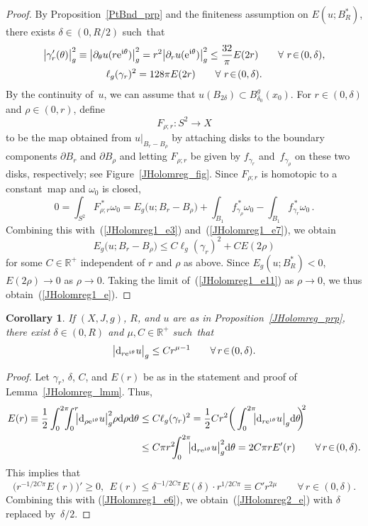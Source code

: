 \documentclass[11pt]{article}
\numberwithin{equation}{section}
\newtheorem{crl}[thm]{Corollary}
\theoremstyle{definition}
\def\BE#1{\begin{equation}\label{#1}}
\def\EE{\end{equation}}
\def\eref#1{(\ref{#1})}
\def\lra{\longrightarrow}
\def\fI{\mathfrak i}
\def\R{\mathbb R}
\def\ga{\gamma}
\def\de{\delta}
\def\om{\omega}
\def\th{\theta}
\def\prt{\partial}
\def\nd{\textnormal{d}}
\def\ne{\textnormal{e}}
\begin{document}
\begin{proof}
\noindent
By Proposition~\ref{PtBnd_prp} and the finiteness assumption on $E(u;B_R^*)$, 
there exists $\de\!\in\!(0,R/2)$ such~that
\begin{gather}
\label{JHolomreg1_e6}
\big|\ga_r'(\th)\big|_g^2\equiv 
\big|\prt_{\th}u(r\ne^{\fI\th})\big|_g^2=r^2\big|\prt_ru(\ne^{\fI\th})\big|_g^2
\le \frac{32}{\pi}E(2r) \qquad\forall~r\!\in\!(0,\de),\\
\label{JHolomreg1_e7}
\ell_g(\ga_r)^2=128\pi E(2r)
\qquad\forall~r\!\in\!(0,\de).
\end{gather}
By the continuity of~$u$, we can assume that  $u(B_{2\de})\!\subset\!B_{\de_0}^g(x_0)$.
For $r\!\in\!(0,\de)$ and $\rho\!\in\!(0,r)$, define
$$F_{\rho;r}\!:S^2\lra X$$ 
to be the map obtained from $u|_{B_r-B_{\rho}}$ by attaching disks to the boundary components 
$\prt B_r$ and $\prt B_{\rho}$ and letting $F_{\rho;r}$ be given by 
$f_{\ga_r}$ and~$f_{\ga_{\rho}}$ on these two disks, respectively;
see Figure~\ref{JHolomreg_fig}.
Since $F_{\rho;r}$ is  homotopic to a constant~map and $\om_0$ is closed,
$$0=\int_{S^2}\!F_{\rho;r}^{\,*}\om_0
=E_g\big(u;B_r\!-\!B_{\rho}\big)+\int_{B_1}\!\!\!f_{\ga_{\rho}}^{\,*}\om_0
-\int_{B_1}\!\!\!f_{\ga_r}^{\,*}\om_0\,.$$
Combining this with~\eref{JHolomreg1_e3} and~\eref{JHolomreg1_e7}, we obtain
\BE{JHolomreg1_e11}E_g\big(u;B_r\!-\!B_{\rho}\big)\le C\ell_g(\ga_r)^2+CE(2\rho)\EE
for some $C\!\in\!\R^+$ independent of $r$ and $\rho$ as above.
Since $E_g(u;B_R^*)\!<\!0$, $E(2\rho)\!\lra\!0$ as \hbox{$\rho\!\lra\!0$}.
Taking the limit of~\eref{JHolomreg1_e11} as $\rho\!\lra\!0$, 
we thus obtain~\eref{JHolomreg1_e}.
\end{proof}


\begin{crl}\label{JHolomreg_crl}
If $(X,J,g)$, $R$, and $u$ are as in Proposition~\ref{JHolomreg_prp},
there exist $\de\!\in\!(0,R)$ and $\mu,C\!\in\!\R^+$ such~that 
\BE{JHolomreg2_e}
\big|\nd_{r\ne^{\fI\th}}u\big|_g\le Cr^{\mu-1} 
\qquad\forall\,r\!\in\!(0,\de).\EE
\end{crl}

\begin{proof}
Let $\ga_r$, $\de$, $C$, and $E(r)$
be as in the statement and proof of Lemma~\ref{JHolomreg_lmm}.
Thus,
\begin{equation*}\begin{split}
E(r)\equiv\frac12\int_0^{2\pi}\!\!\!\!\int_0^r\!\!\!
\big|\nd_{\rho\ne^{\fI\th}}u\big|_g^2 \rho\nd\rho\nd\th
&\le C\ell_g(\ga_r)^2= \frac12 Cr^2
\bigg(\int_0^{2\pi}\!\!\!\big|\nd_{r\ne^{\fI\th}}u\big|_g\nd\th\!\!\bigg)^{\!\!2}\\
&\le C\pi r^2\!\!\!\int_0^{2\pi}\!\!\!\big|\nd_{r\ne^{\fI\th}}u\big|_g^2\nd\th
=2C\pi r E'(r) \qquad\forall\,r\!\in\!(0,\de).
\end{split}\end{equation*}
This implies that 
$$\big(r^{-1/2C\pi}E(r)\big)'\ge0, ~~ 
E(r)\le \de^{-1/2C\pi}E(\de)\cdot r^{1/2C\pi}\equiv C'r^{2\mu}
\qquad\forall\,r\!\in\!(0,\de).$$
Combining this with \eref{JHolomreg1_e6}, we obtain~\eref{JHolomreg2_e}
with $\de$ replaced by~$\de/2$.
\end{proof}
\end{document}
